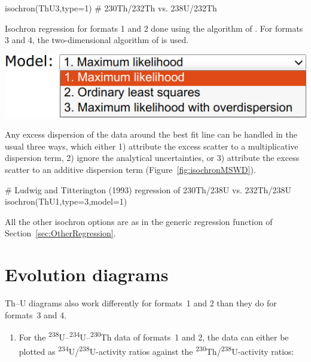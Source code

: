 \begin{refsection}
\begin{console}
isochron(ThU3,type=1) # 230Th/232Th vs. 238U/232Th
\end{console}

Isochron regression for formats 1 and 2 done using the algorithm of
\citet{ludwig1994}. For formats 3 and 4, the two-dimensional algorithm
of \citet{york2004} is used.\\

\noindent\begin{minipage}[t]{.45\linewidth}
\strut\vspace*{-\baselineskip}\newline
\includegraphics[width=\linewidth]{../figures/PbPbIsochronModels.png}
\end{minipage}
\begin{minipage}[t]{.55\linewidth}
  Any excess dispersion of the data around the best fit line can be
  handled in the usual three ways, which either 1) attribute the
  excess scatter to a multiplicative dispersion term, 2) ignore the
  analytical uncertainties, or 3) attribute the excess scatter to an
  additive dispersion term (Figure~\ref{fig:isochronMSWD}).
\end{minipage}

\begin{script}
# Ludwig and Titterington (1993) regression of 230Th/238U vs. 232Th/238U
isochron(ThU1,type=3,model=1)
\end{script}

All the other isochron options are as in the generic regression
function of Section~\ref{sec:OtherRegression}.

\section{Evolution diagrams}

Th--U diagrams also work differently for formats~1 and 2 than they do
for formats~3 and 4.

\begin{enumerate}

\item For the
  \textsuperscript{238}U--\textsuperscript{234}U--\textsuperscript{230}Th
  data of formats~1 and 2, the data can either be plotted as
  \textsuperscript{234}U/\textsuperscript{238}U-activity ratios
  against the \textsuperscript{230}Th/\textsuperscript{238}U-activity
  ratios:


\end{enumerate}
\end{refsection}
